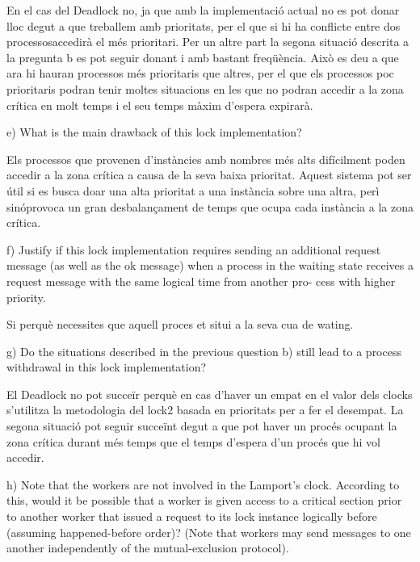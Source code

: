 \documentclass[a4paper, 10pt]{article}
\begin{document}
En el cas del Deadlock no, ja que amb la implementació actual no es pot donar lloc degut a que treballem amb prioritats, per el que si hi ha conflicte entre dos processosaccedirà el més prioritari.
Per un altre part la segona situació descrita a la pregunta b es pot seguir donant i amb bastant freqüència. Això es deu a que ara hi hauran processos més prioritaris que altres, per el que els processos poc prioritaris podran tenir moltes situacions en les que no podran accedir a la zona crítica en molt temps i el seu temps màxim d'espera expirarà.
\newline

e) What is the main drawback of this lock implementation?

Els processos que provenen d'instàncies amb nombres més alts difícilment poden accedir a la zona crítica a causa de la seva baixa prioritat. Aquest sistema pot ser útil si es busca doar una alta prioritat a una instància sobre una altra, perì sinóprovoca un gran desbalançament de temps que ocupa cada instància a la zona crítica.
\newline

f) Justify if this lock implementation requires sending an additional request message (as well as the ok message) when a process in the waiting state receives a request message with the same logical time from another pro-
cess with higher priority.

Si perquè necessites que aquell proces et situi a la seva cua de wating.
\newline

g) Do the situations described in the previous question b) still lead to a
process withdrawal in this lock implementation?

El Deadlock no pot succeïr perquè en cas d'haver un empat en el valor dels clocks s'utilitza la metodologia del lock2 basada en prioritats per a fer el desempat.
La segona situació pot seguir succeïnt degut a que pot haver un procés ocupant la zona crítica durant més temps que el temps d'espera d'un procés que hi vol accedir.
\newline

h) Note that the workers are not involved in the Lamport’s clock. According
to this, would it be possible that a worker is given access to a critical
section prior to another worker that issued a request to its lock instance
logically before (assuming happened-before order)? (Note that workers
may send messages to one another independently of the mutual-exclusion
protocol).
\end{document}
